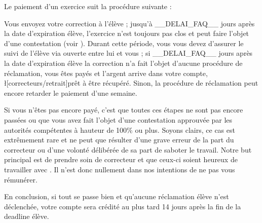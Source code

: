 ﻿Le paiement d'un exercice suit la procédure suivante :

\begin{itemize}
	\li Vous envoyez votre correction à l'élève ;
	\li jusqu'à __DELAI_FAQ__ jours après la date d'expiration élève, l'exercice n'est toujours pas clos et peut faire l'objet d'une contestation (voir ). Durant cette période, vous vous devez d'assurer le suivi de l'élève via  ouverte entre lui et vous ;
	\li si __DELAI_FAQ__ jours après la date d'expiration élève la correction n'a fait l'objet d'aucune procédure de réclamation, vous êtes payés et l'argent arrive dans votre compte, \l[correcteurs/retrait]{prêt à être récupéré}. Sinon, la procédure de réclamation peut encore retarder le paiement d'une semaine.
\end{itemize}

Si vous n'êtes pas encore payé, c'est que toutes ces étapes ne sont pas encore passées ou que vous avez fait l'objet d'une contestation approuvée par les autorités compétentes à hauteur de 100\% ou plus. Soyons clairs, ce cas est extrêmement rare et ne peut que résulter d'une grave erreur de la part du correcteur ou d'une volonté délibérée de sa part de saboter le travail. Notre but principal est de prendre soin de correcteur et que ceux-ci soient heureux de travailler avec \eDevoir. Il n'est donc nullement dans nos intentions de ne pas vous rémunérer.

En conclusion, si tout se passe bien et qu'aucune réclamation élève n'est déclenchée, votre compte \eDevoir sera crédité au plus tard 14 jours après la fin de la deadline élève.